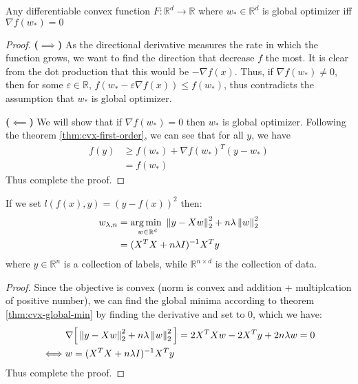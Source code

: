 \begin{theorem}
    \label{thm:cvx-global-min}
    Any differentiable convex function $F:\mathbb{R}^d\rightarrow \mathbb{R}$ where $w_*\in \mathbb{R}^d$ is global optimizer iff $\nabla f(w_*) = 0$ 
\end{theorem}
\begin{proof}
    \textbf{($\boldsymbol \implies$)} As the directional derivative measures the rate in which the function grows, we want to find the direction that decrease $f$ the most. It is clear from the dot production that this would be $-\nabla f(x)$. Thus, if $\nabla f(w_*) \ne 0$, then for some $\varepsilon \in \mathbb{R}$, $f(w_* - \varepsilon \nabla f(x)) \le f(w_*)$, thus contradicts the assumption that $w_*$ is global optimizer.
    
    \textbf{($\boldsymbol \impliedby$)} We will show that if $\nabla f(w_*) = 0$ then $w_*$ is global optimizer. Following the theorem \ref{thm:cvx-first-order}, we can see that for all $y$, we have 
    \begin{equation*}
    \begin{aligned}
        f(y) &\ge f(w_*) + \nabla f(w_*)^T(y - w_*) \\
        &= f(w_*)
    \end{aligned}
    \end{equation*}
    Thus complete the proof.
\end{proof}

\begin{proposition}
    If we set $l(f(x), y) = (y-f(x))^2$ then:
    \begin{equation*}
    \begin{aligned}
        w_{\lambda, n} &= \underset{w\in \mathbb{R}^d}{\arg\min \ } \left\lVert y-Xw\right\rVert^2_2 + n\lambda\left\lVert w\right\rVert^2_2 \\ 
        &= (X^TX+n\lambda I)^{-1}X^Ty
    \end{aligned}
    \end{equation*}
    where $y \in \mathbb{R}^n$ is a collection of labels, while $\mathbb{R}^{n\times d}$ is the collection of data. 
\end{proposition}
\begin{proof}
    Since the objective is convex (norm is convex and addition + multiplcation of positive number), we can find the global minima according to theorem \ref{thm:cvx-global-min} by finding the derivative and set to $0$, which we have:
    \begin{equation*}
    \begin{aligned}
        &\nabla \Big[\left\lVert y-Xw\right\rVert^2_2 + n\lambda\left\lVert w\right\rVert^2_2 \Big] = 2X^TXw - 2X^Ty + 2n\lambda w = 0 \\
        \iff& w = (X^TX+n\lambda I)^{-1}X^Ty
    \end{aligned}
    \end{equation*}
    Thus complete the proof.
\end{proof}

